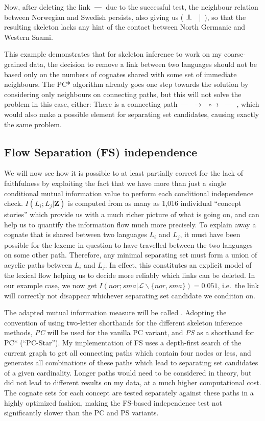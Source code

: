 Now, after deleting the link  $\arrowLL$  due to the successful test, the neighbour relation between Norwegian and Swedish persists, also giving us ( $\indep$ \ |\ ), so that the resulting skeleton lacks any hint of the contact between North Germanic and Western Saami.

This example demonstrates that for skeleton inference to work on my coarse-grained data, the decision to remove a link between two languages should not be based only on the numbers of cognates shared with some set of immediate neighbours. The PC* algorithm already goes one step towards the solution by considering only neighbours on connecting paths, but this will not solve the problem in this case, either: There is a connecting path  $\arrowLL$  $\arrowLA$  $\arrowOA$  $\arrowLL$ , which would also make  a possible element for separating set candidates, causing exactly the same problem.

\largerpage
\subsection{Flow Separation (FS) independence}
We will now see how it is possible to at least partially correct for the lack of faithfulness by exploiting the fact that we have more than just a single conditional mutual information value to perform each conditional independence check. $I(L_i;L_j|\mathbf{Z})$ is computed from as many as 1,016 individual ``concept stories'' which provide us with a much richer picture of what is going on, and can help us to quantify the information flow much more precisely. To explain away a cognate that is shared between two languages $L_i$ and $L_j$, it must have been possible for the lexeme in question to have travelled between the two languages on some other path. Therefore, any minimal separating set must form a union of acyclic paths between $L_i$ and $L_j$. In effect, this constitutes an explicit model of the lexical flow helping us to decide more reliably which links can be deleted. In our example case, we now get $I(nor;sma|\mathcal{L}\backslash\{nor,sma\}) = 0.051$, i.e.\ the link will correctly not disappear whichever 
separating set candidate we condition on.

The adapted mutual information measure will be called \textit{}. Adopting the convention of using two-letter shorthands for the different skeleton inference methods, \textit{PC} will be used for the vanilla PC variant, and \textit{PS} as a shorthand for PC* (``PC-Star''). My implementation of FS uses a depth-first search of the current graph to get all connecting paths which contain four nodes or less, and generates all combinations of these paths which lead to separating set candidates of a given cardinality. Longer paths would need to be considered in theory, but did not lead to different results on my data, at a much higher computational cost. The cognate sets for each concept are tested separately against these paths in a highly optimized fashion, making the FS-based independence test not significantly slower than the PC and PS variants.

